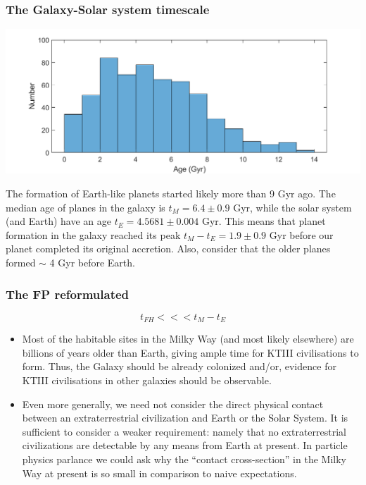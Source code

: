 \begin{frame}
\frametitle{The Galaxy-Solar system timescale}

\includegraphics[scale=0.45]{M00s9.png}


The formation of Earth-like planets started likely more than 9 Gyr ago. The median age of planes in the galaxy is $t_M =6.4 \pm 0.9$ Gyr, while the solar system (and Earth) have an age $t_E =4.5681 \pm 0.004$ Gyr. This means that planet formation in the galaxy reached its peak  $t_M - t_E = 1.9 \pm 0.9$ Gyr before our planet completed its original accretion. Also, consider that the older planes formed $\sim$ 4 Gyr before Earth.  

\end{frame}

\begin{frame}
\frametitle{The FP reformulated}

\begin{block}{}

$$ t_{FH} <<< t_M - t_E$$

\end{block}

\vspace{0.5cm}
\begin{itemize}
\item
Most of the habitable sites in the Milky Way (and most likely elsewhere) are billions of years older than Earth, giving ample time for KTIII civilisations to form. Thus, the Galaxy should be already colonized and/or, evidence for KTIII civilisations in other galaxies should be observable. 
%
\item
Even more generally, we need not consider the direct physical contact between an extraterrestrial civilization and Earth or the Solar System. It is sufficient to consider a weaker requirement: namely that no extraterrestrial civilizations are detectable by any means from Earth at present. In particle physics parlance we could ask why the ``contact cross-section'' in the Milky Way at present is so small in comparison to naive expectations.
\end{itemize}
\end{frame}

